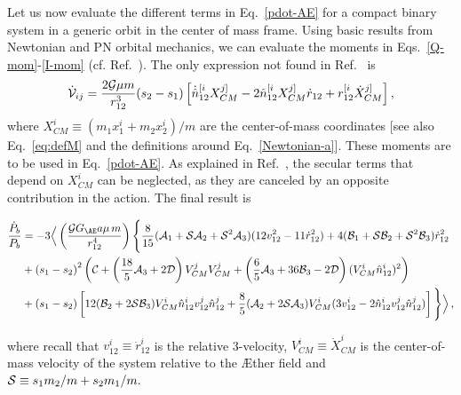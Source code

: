 \documentclass[prd,aps,twocolumn,nofootinbib,showpacs,superscriptaddress]{revtex4-1}
\newcommand\be{\begin{equation}}
\newcommand\ee{\end{equation}}
\def\m{\mu}
\newcommand\bw{\begin{widetext}}
\newcommand\ew{\end{widetext}}
\newcommand{\nn}{\nonumber}
\begin{document}
Let us now evaluate the different terms in Eq.~\eqref{pdot-AE} for a compact binary system in a generic orbit in the center of mass frame. Using basic results from Newtonian and PN orbital mechanics, we can evaluate the moments in Eqs.~\eqref{Q-mom}-\eqref{I-mom} (cf. Ref.~\cite{Foster:2007gr}). The only expression not found in Ref.~\cite{Foster:2007gr} is
\be
\dot {\cal V}_{ij}=\frac{2{\cal G} \m m}{r_{12}^3} (s_2-s_1)\left[\dot{\hat n}_{12}^{[i}X_{CM}^{j]}-2\hat n_{12}^{[i}X_{CM}^{j]}\dot r_{12}+r_{12}^{[i}\dot X_{CM}^{j]}\right],
\ee
where $X^i_{CM}\equiv (m_1 x_1^i+m_2 x_2^i)/m$ are the center-of-mass coordinates [see also Eq.~\eqref{eq:defM} and the definitions around Eq.~\eqref{Newtonian-a}].
These moments are to be used in Eq.~\eqref{pdot-AE}. As explained in Ref.~\cite{Foster:2007gr}, the secular terms that depend on $X_{CM}^i$ can be neglected, 
as they are canceled by an opposite contribution in the action. The final result is 
\newpage
\bw
\begin{align}
\label{Pdot-AE}
\frac{\dot{P}_{b}}{P_{b}} &= - 3  \Big\langle  \left(\frac{ {\cal G} G_{\AE}a \m \,m}{r_{12}^4}\right) 
  \Bigg\{ \frac{8}{15}({\cal A}_1+{\cal
  S}{\cal A}_2+ {\cal S}^2{\cal A}_3)(12v_{12}^2-11 \dot
r_{12}^2)+4({\cal B}_1+{\cal S}{\cal B}_2+ {\cal S}^2{\cal B}_3)\dot
r_{12}^2 \nn
\\ &+\left(s_1-s_2\right)^2\left({\cal
  C}+\left(\frac{18}{5}{\cal A}_3+2{\cal D} \right) V_{CM}^{j} V_{CM}^{j}+\left(\frac{6}{5}{\cal A}_3+36 {\cal B}_3-2{\cal D}\right)
(V_{CM}^{i} \hat n_{12}^i)^2\right) \nn
\\ &+\left(s_1-s_2\right)\left[12({\cal
    B}_2+2{\cal S}{\cal B}_3)V_{CM}^i \hat n_{12}^i v^j_{12} \hat n_{12}^j+\frac{8}{5}({\cal A}_2+2{\cal S}{\cal
    A}_3)V_{CM}^i(3v_{12}^i-2\hat n_{12}^i v_{12}^j \hat n_{12}^j)
  \right]\Bigg\}\Big\rangle\,,
\end{align}
\ew 
where recall that $v_{12}^{i}\equiv \dot r_{12}^i$ is the relative 3-velocity,  $V_{CM}^{i}\equiv \dot X^i_{CM}$ is the center-of-mass velocity of the system relative to the \AE ther field and
${\cal{S}} \equiv s_1 m_2/m +s_2 m_1/m.$
\end{document}
